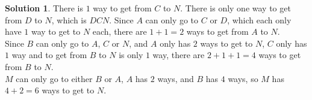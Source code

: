\documentclass{article}
\theoremstyle{definition}
\newtheorem*{solution}{Solution}
\begin{document}
\begin{multicols*}{2}
\begin{enumerate}
\begin{center}
            \end{center}
            \begin{solution}
                There is $1$ way to get from $C$ to $N$.
                There is only one way to get from $D$ to $N$, which is $DCN$.
                Since $A$ can only go to $C$ or $D$, which each only have $1$ way to get to $N$ each, there are $1 + 1 = 2$ ways to get from $A$ to $N$. \\
                Since $B$ can only go to $A$, $C$ or $N$, and $A$ only has $2$ ways to get to $N$, $C$ only has $1$ way and to get from $B$ to $N$ is only $1$ way, there are $2 + 1 + 1 = 4$ ways to get from $B$ to $N$. \\
                $M$ can only go to either $B$ or $A$, $A$ has $2$ ways, and $B$ has $4$ ways, so $M$ has $4 + 2 = 6$ ways to get to $N$.
            \end{solution}
        \end{enumerate}
\end{multicols*}
\end{document}
